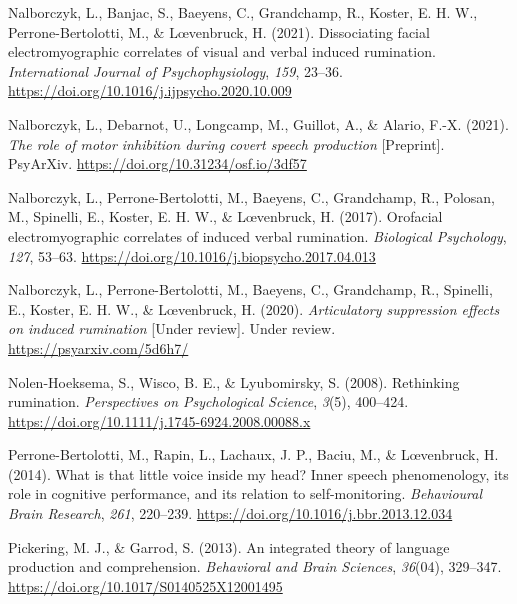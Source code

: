 \documentclass[
  english,
  man, donotrepeattitle,floatsintext]{apa6}
\newlength{\cslhangindent}
\newlength{\cslentryspacingunit} %
\newenvironment{CSLReferences}[2] %
 {%
  \setlength{\parindent}{0pt}
  \ifodd #1
  \let\oldpar\par
  \def\par{\hangindent=\cslhangindent\oldpar}
  \fi
  \setlength{\parskip}{#2\cslentryspacingunit}
 }%
 {}
\begin{document}
\begin{CSLReferences}{1}{0}
\leavevmode{}%
Nalborczyk, L., Banjac, S., Baeyens, C., Grandchamp, R., Koster, E. H. W., Perrone-Bertolotti, M., \& Lœvenbruck, H. (2021). Dissociating facial electromyographic correlates of visual and verbal induced rumination. \emph{International Journal of Psychophysiology}, \emph{159}, 23--36. \url{https://doi.org/10.1016/j.ijpsycho.2020.10.009}

\leavevmode{}%
Nalborczyk, L., Debarnot, U., Longcamp, M., Guillot, A., \& Alario, F.-X. (2021). \emph{The role of motor inhibition during covert speech production} {[}Preprint{]}. {PsyArXiv}. \url{https://doi.org/10.31234/osf.io/3df57}

\leavevmode{}%
Nalborczyk, L., Perrone-Bertolotti, M., Baeyens, C., Grandchamp, R., Polosan, M., Spinelli, E., Koster, E. H. W., \& Lœvenbruck, H. (2017). Orofacial electromyographic correlates of induced verbal rumination. \emph{Biological Psychology}, \emph{127}, 53--63. \url{https://doi.org/10.1016/j.biopsycho.2017.04.013}

\leavevmode{}%
Nalborczyk, L., Perrone-Bertolotti, M., Baeyens, C., Grandchamp, R., Spinelli, E., Koster, E. H. W., \& Lœvenbruck, H. (2020). \emph{Articulatory suppression effects on induced rumination} {[}Under review{]}. Under review. \url{https://psyarxiv.com/5d6h7/}

\leavevmode{}%
Nolen-Hoeksema, S., Wisco, B. E., \& Lyubomirsky, S. (2008). Rethinking rumination. \emph{Perspectives on Psychological Science}, \emph{3}(5), 400--424. \url{https://doi.org/10.1111/j.1745-6924.2008.00088.x}

\leavevmode{}%
Perrone-Bertolotti, M., Rapin, L., Lachaux, J. P., Baciu, M., \& Lœvenbruck, H. (2014). What is that little voice inside my head? Inner speech phenomenology, its role in cognitive performance, and its relation to self-monitoring. \emph{Behavioural Brain Research}, \emph{261}, 220--239. \url{https://doi.org/10.1016/j.bbr.2013.12.034}

\leavevmode{}%
Pickering, M. J., \& Garrod, S. (2013). An integrated theory of language production and comprehension. \emph{Behavioral and Brain Sciences}, \emph{36}(04), 329--347. \url{https://doi.org/10.1017/S0140525X12001495}


\end{CSLReferences}
\end{document}
